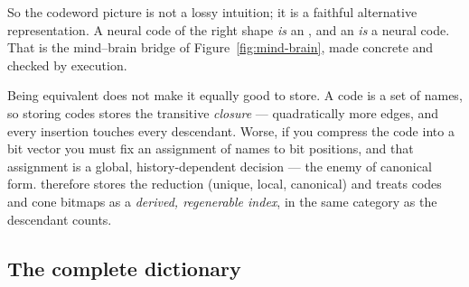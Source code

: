 So the codeword picture is not a lossy intuition; it is a faithful alternative
representation. A neural code of the right shape \emph{is} an \odag{}, and an
\odag{} \emph{is} a neural code. That is the mind--brain bridge of
Figure~\ref{fig:mind-brain}, made concrete and checked by execution.

\begin{remark}
Being equivalent does not make it equally good to store. A code is a set of
names, so storing codes stores the transitive \emph{closure} --- quadratically
more edges, and every insertion touches every descendant. Worse, if you
compress the code into a bit vector you must fix an assignment of names to bit
positions, and that assignment is a global, history-dependent decision --- the
enemy of canonical form. \odag{} therefore stores the reduction (unique,
local, canonical) and treats codes and cone bitmaps as a \emph{derived,
regenerable index}, in the same category as the descendant counts.
\end{remark}

\subsection{The complete dictionary}
\label{sec:notation-table}

